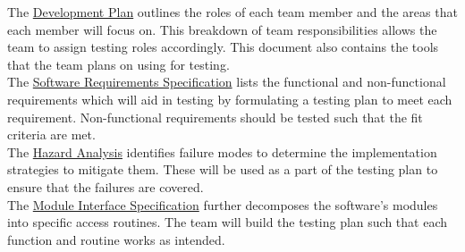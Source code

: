 \documentclass[12pt, titlepage]{article}
\begin{document}

\noindent The \href{https://github.com/stanreee/sign-language-learning/blob/main/docs/DevelopmentPlan/DevelopmentPlan.pdf}{Development Plan} outlines the roles of each team member and the areas that each member will focus on. This breakdown of team responsibilities allows the team to assign testing roles accordingly. This document also contains the tools that the team plans on using for testing.\\


\noindent The \href{https://github.com/stanreee/sign-language-learning/blob/main/docs/SRS/SRS.pdf}{Software Requirements Specification} lists the functional and non-functional requirements which will aid in testing by formulating a testing plan to meet each requirement. Non-functional requirements should be tested such that the fit criteria are met.\\


\noindent The \href{https://github.com/stanreee/sign-language-learning/blob/main/docs/HazardAnalysis/HazardAnalysis.pdf}{Hazard Analysis} identifies failure modes to determine the implementation strategies to mitigate them. These will be used as a part of the testing plan to ensure that the failures are covered.\\


\noindent The \href{https://github.com/stanreee/sign-language-learning/blob/main/docs/Design/SoftDetailedDes/MIS.pdf}{Module Interface Specification} further decomposes the software's modules into specific access routines. The team will build the testing plan such that each function and routine works as intended.
\end{document}
